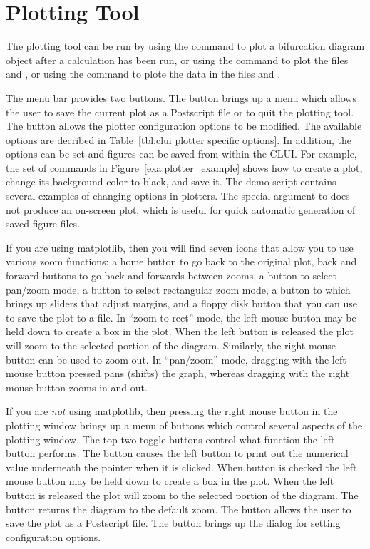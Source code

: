 \documentclass[12pt]{report}
\begin{document}
 \section{ Plotting Tool}\label{clui:plotting}

 The plotting tool can be run by using the command
  to plot a bifurcation diagram object 
 after a calculation has been run, or using the command
  to plot the files  and ,
 or using the command  to plote the data in the
 files  and .  

 The menu bar provides two buttons.  The 
 button brings up a menu which allows the user to save
 the current plot as a Postscript file or
 to quit the plotting tool.
 The  button allows the plotter
 configuration options to be modified.
 The available options are decribed in
 Table~\ref{tbl:clui plotter specific options}.  In addition, the options can 
 be set and figures can be saved from within the CLUI.  For example,
 the set of commands in Figure~\ref{exa:plotter_example} shows how to
 create a plot, change its background color to black, and save it.  The
 demo script  contains several
 examples of changing options in plotters. 
 The special argument 
  to  does not produce an on-screen
 plot, which is useful for quick automatic generation of saved figure files.

 If you are using matplotlib, then you will find seven icons that allow
 you to use various zoom functions: a home button to go back to the
 original plot, back and forward buttons to go back and forwards
 between zooms, a button to select pan/zoom mode, a button to select
 rectangular zoom mode, a button to which brings up sliders that
 adjust margins, and a floppy disk button that you can use
 to save the plot to a file. 
 In ``zoom to rect'' mode, the left mouse button may be held down to create
 a box in the plot.  When the left button is released the plot will
 zoom to the selected portion of the diagram. Similarly, the right
 mouse button can be used to zoom out. In ``pan/zoom'' mode, dragging
 with the left mouse button pressed pans (shifts) the graph, whereas
 dragging with the right mouse button zooms in and out.

 If you are \emph{not} using matplotlib, then
 pressing the right mouse button in the plotting window brings
 up a menu of buttons which control several aspects
 of the plotting window.  The top two toggle buttons
 control what function the left button performs.  
 The  button causes the
 left button to print out the numerical value underneath
 the pointer when it is clicked.
 When  button is checked the left
 mouse button may be held down to create
 a box in the plot.  When the left button
 is released the plot will zoom to the selected
 portion of the diagram.
 The  button returns the
 diagram to the default zoom. 
 The  button allows the user
 to save the plot as a Postscript file.
 The  button brings up
 the dialog for setting configuration options.
\end{document}

